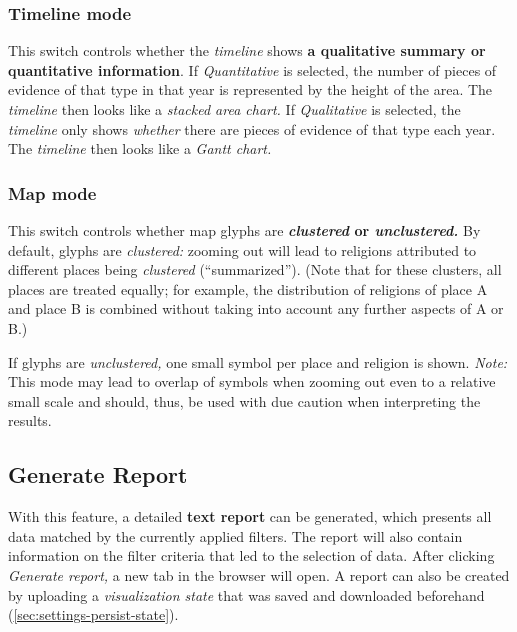 \subsubsection{Timeline mode}
\label{sec:settings-timeline-mode}

This switch controls whether the \emph{timeline} shows \textbf{a qualitative summary or quantitative information}.
If \emph{Quantitative} is selected, the number of pieces of evidence of that type in that year is represented by the height of the area.
The \emph{timeline} then looks like a \emph{stacked area chart.}
If \emph{Qualitative} is selected, the \emph{timeline} only shows \emph{whether} there are pieces of evidence of that type each year.
The \emph{timeline} then looks like a \emph{Gantt chart.}


\subsubsection{Map mode}
\label{sec:settings-map-mode}

This switch controls whether map glyphs are \textbf{\emph{clustered} or \emph{unclustered.}}
By default, glyphs are \emph{clustered:}
zooming out will lead to religions attributed to different places being \emph{clustered} (\enquote{summarized}).
(Note that for these clusters, all places are treated equally;
for example, the distribution of religions of place A and place B is combined without taking into account any further aspects of A or B.)

If glyphs are \emph{unclustered,} one small symbol per place and religion is shown.
\emph{Note:} This mode may lead to overlap of symbols when zooming out even to a relative small scale and should, thus, be used with due caution when interpreting the results.


\subsection{Generate Report}
\label{sec:generate-report}

With this feature, a detailed \textbf{text report} can be generated, which presents all data matched by the currently applied filters.
The report will also contain information on the filter criteria that led to the selection of data.
After clicking \emph{Generate report,} a new tab in the browser will open.
A report can also be created by uploading a \emph{visualization state} that was saved and downloaded beforehand (\cref{sec:settings-persist-state}).

